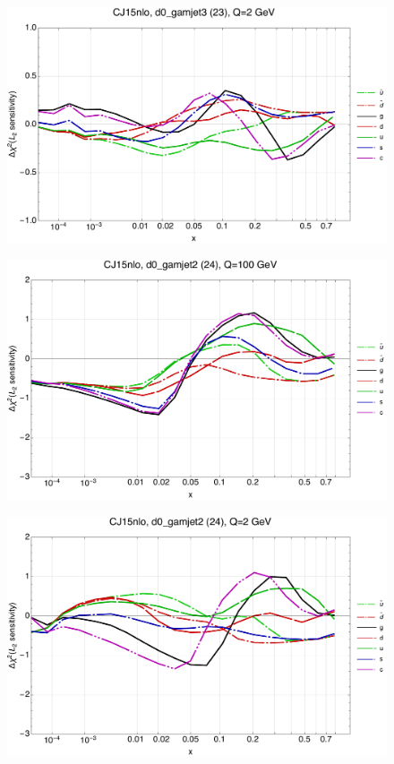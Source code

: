 \documentclass[10pt,aps,prd,floatfix,titlepage]{revtex4}
\begin{document}
\begin{figure}
\includegraphics[width=\textwidth,height=0.44\textheight,keepaspectratio]{1/23_CJ15nlo_L2_q2_Sf_1.pdf}
\caption{}
\end{figure}
\clearpage
\begin{figure}
\includegraphics[width=\textwidth,height=0.44\textheight,keepaspectratio]{1/24_CJ15nlo_L2_q100_Sf_1.pdf}
\caption{}
\end{figure}
\begin{figure}
\includegraphics[width=\textwidth,height=0.44\textheight,keepaspectratio]{1/24_CJ15nlo_L2_q2_Sf_1.pdf}
\caption{}
\end{figure}
\end{document}
